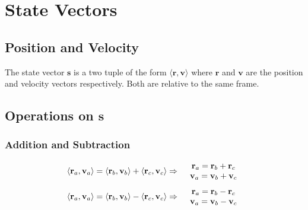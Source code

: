 \section{State Vectors}

\subsection{Position and Velocity}
The state vector $\mathbf{s}$ is a two tuple of the form $\langle \mathbf{r}, \mathbf{v} \rangle$ where $\mathbf{r}$
and $\mathbf{v}$ are the position and velocity vectors respectively. Both are relative to the same frame.


\subsection{Operations on $\mathbf{s}$}
\subsubsection{Addition and Subtraction}
\begin{equation}
    \begin{array}{l l}
        \langle \mathbf{r}_a, \mathbf{v}_a \rangle = \langle \mathbf{r}_b, \mathbf{v}_b \rangle + \langle \mathbf{r}_c, \mathbf{v}_c \rangle \Rightarrow &
        \begin{array}{c}
            \mathbf{r}_a = \mathbf{r}_b + \mathbf{r}_c \\
            \mathbf{v}_a = \mathbf{v}_b + \mathbf{v}_c
        \end{array}
    \end{array}
\end{equation}
\begin{equation}
    \begin{array}{l l}
        \langle \mathbf{r}_a, \mathbf{v}_a \rangle = \langle \mathbf{r}_b, \mathbf{v}_b \rangle - \langle \mathbf{r}_c, \mathbf{v}_c \rangle \Rightarrow &
        \begin{array}{c}
            \mathbf{r}_a = \mathbf{r}_b - \mathbf{r}_c \\
            \mathbf{v}_a = \mathbf{v}_b - \mathbf{v}_c
        \end{array}
    \end{array}
\end{equation}


